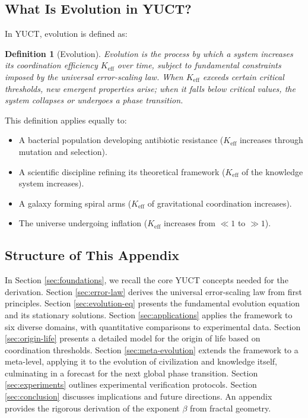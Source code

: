\documentclass[12pt,a4paper]{article}
\newtheorem{definition}[theorem]{Definition}
\theoremstyle{remark}
\newcommand{\Keff}{K_{\mathrm{eff}}}
\begin{document}
	\subsection{What Is Evolution in YUCT?}
	
	In YUCT, evolution is defined as:
	
	\begin{definition}[Evolution]
		Evolution is the process by which a system increases its coordination efficiency $\Keff$ over time, subject to fundamental constraints imposed by the universal error-scaling law. When $\Keff$ exceeds certain critical thresholds, new emergent properties arise; when it falls below critical values, the system collapses or undergoes a phase transition.
	\end{definition}
	
	This definition applies equally to:
	
	\begin{itemize}
		\item A bacterial population developing antibiotic resistance ($\Keff$ increases through mutation and selection).
		\item A scientific discipline refining its theoretical framework ($\Keff$ of the knowledge system increases).
		\item A galaxy forming spiral arms ($\Keff$ of gravitational coordination increases).
		\item The universe undergoing inflation ($\Keff$ increases from $\ll 1$ to $\gg 1$).
	\end{itemize}
	
	\subsection{Structure of This Appendix}
	
	In Section \ref{sec:foundations}, we recall the core YUCT concepts needed for the derivation. Section \ref{sec:error-law} derives the universal error-scaling law from first principles. Section \ref{sec:evolution-eq} presents the fundamental evolution equation and its stationary solutions. Section \ref{sec:applications} applies the framework to six diverse domains, with quantitative comparisons to experimental data. Section \ref{sec:origin-life} presents a detailed model for the origin of life based on coordination thresholds. Section \ref{sec:meta-evolution} extends the framework to a meta-level, applying it to the evolution of civilization and knowledge itself, culminating in a forecast for the next global phase transition. Section \ref{sec:experiments} outlines experimental verification protocols. Section \ref{sec:conclusion} discusses implications and future directions. An appendix provides the rigorous derivation of the exponent $\beta$ from fractal geometry.
	
\end{document}
